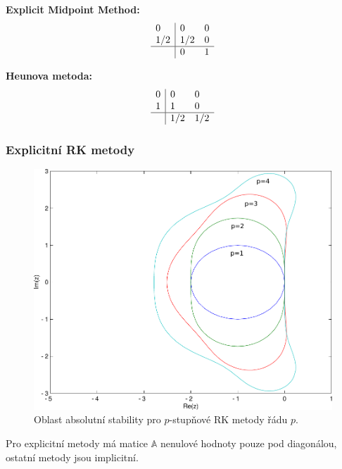 \documentclass[a4paper, 12pt]{book}
\theoremstyle{definition}
\def\tn#1{{\mathbb{#1}}}    %
\begin{document}
{\bf Explicit Midpoint Method:}
\begin{equation}
    \begin{array}{l|ll}
        0 & 0 & 0  \\
        1/2 & 1/2 & 0  \\
        \hline
             & 0 & 1 \\
    \end{array}
\end{equation}

{\bf Heunova metoda:}
\begin{equation}
    \begin{array}{l|ll}
        0 & 0 & 0  \\
        1 & 1 & 0  \\
        \hline
             & 1/2 & 1/2 \\
    \end{array}
\end{equation}


\subsubsection{Explicitní RK metody}
\begin{figure}[h]
    \label{fig:as_rk}
    \centering
    \includegraphics[scale=0.7]{as_rk.pdf} 
    \caption{Oblast absolutní stability pro $p$-stupňové RK metody řádu $p$.}
\end{figure}

Pro explicitní metody má matice $\tn A$ nenulové hodnoty pouze pod diagonálou, ostatní metody jsou implicitní.
\end{document}
